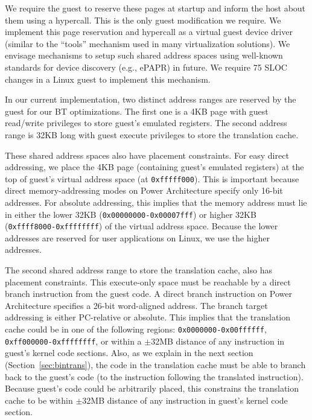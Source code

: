 \documentclass[10pt,twocolumn]{article}
\begin{document}
We require the guest to reserve these pages at startup and inform the host about
them using a hypercall.
This is the only guest modification we require.
We implement this page reservation
and hypercall as a virtual guest device driver (similar to the ``tools'' mechanism
used in many virtualization solutions). We envisage mechanisms to setup
such shared address spaces using well-known standards for device
discovery (e.g., ePAPR\cite{ePAPR}) in future.
We require 75 SLOC changes in a Linux guest to implement this mechanism.

In our current implementation, two distinct address ranges are reserved by the
guest for our BT optimizations.
The first one is a 4KB page with guest read/write privileges
to store guest's emulated registers.  The second address range is 32KB long
with guest execute privileges to store the translation cache.

These shared address spaces also have placement constraints. For easy direct
addressing, we place the 4KB page (containing guest's emulated registers) at
the top of guest's virtual address space (at {\tt 0xfffff000}). This is important 
because direct memory-addressing modes on Power Architecture specify only 16-bit
addresses. For absolute addressing, this implies that the memory
address must lie in either
the lower 32KB ({\tt 0x00000000-0x00007fff}) or higher
32KB ({\tt 0xffff8000-0xffffffff}) of the virtual address space. Because the lower
addresses are reserved for user applications on Linux, we use the higher addresses.

The second shared address range to store the translation cache, also has placement
constraints. This execute-only space must be reachable
by a direct branch instruction from the guest code. A direct branch instruction
on Power Architecture specifies a 26-bit
word-aligned address. The branch target addressing is either PC-relative
or absolute. This implies that the translation cache could be
in one of the following regions: {\tt 0x0000000-0x00ffffff}, {\tt 0xff000000-0xffffffff},
or within a $\pm$32MB distance of any instruction in guest's kernel code sections.
Also, as we explain in the
next section (Section~\ref{sec:bintrans}), the code in the translation cache must
be able to branch
back to the guest's code (to the instruction following the translated instruction).
Because guest's code could be arbitrarily placed, this constrains the translation
cache to be within $\pm$32MB distance of any instruction in
guest's kernel code section.
\end{document}
